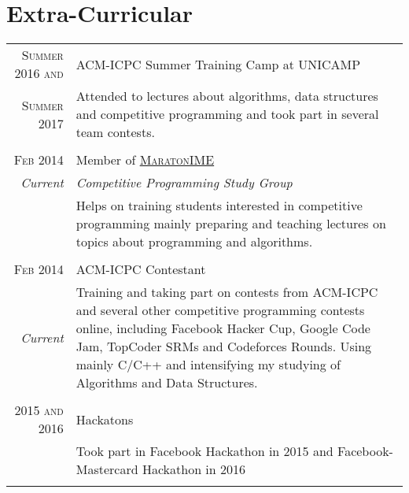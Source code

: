 \documentclass[a4paper,10pt]{article} %
\begin{document}
\section{Extra-Curricular}


\begin{tabular}{r|p{11cm}}
\textsc{Summer 2016 and} & \textsc{ACM-ICPC} Summer Training Camp at UNICAMP \\
\textsc{Summer 2017}     & \footnotesize{Attended to lectures about algorithms, data structures and competitive programming and took part in several team contests.} \\
\multicolumn{2}{c}{} \\

\textsc{Feb 2014}     & Member of \textsc{\href{https://www.ime.usp.br/~maratona/}{MaratonIME}} \\
\emph{Current}        & \hfill \hfill \textit{Competitive Programming Study Group} \\
 &\footnotesize{Helps on training students interested in competitive programming mainly preparing and teaching lectures on topics about programming and algorithms.} \\
\multicolumn{2}{c}{} \\

\textsc{Feb 2014}     & \textsc{ACM-ICPC} Contestant \\
\emph{Current}        & \footnotesize{Training and taking part on contests from ACM-ICPC and several other competitive programming contests online, including Facebook Hacker Cup, Google Code Jam, TopCoder SRMs and Codeforces Rounds. Using mainly C/C++ and intensifying my studying of Algorithms and Data Structures.} \\
\multicolumn{2}{c}{} \\

\textsc{2015 and 2016} & Hackatons \\
& \footnotesize{Took part in Facebook Hackathon in 2015 and Facebook-Mastercard Hackathon in 2016} \\
\multicolumn{2}{c}{} \\

\end{tabular}
\end{document}
